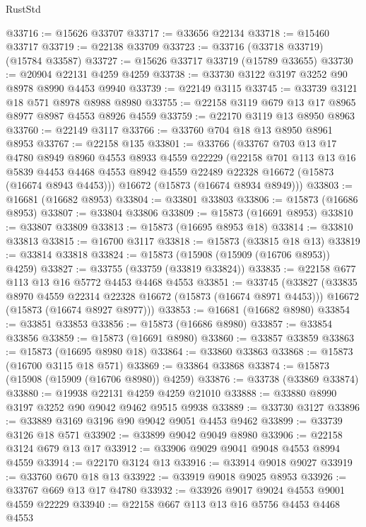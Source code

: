 \begin{lexlean}{RustStd}
\begin{coremodule}
@33716 := @15626 @33707
@33717 := @33656 @22134
@33718 := @15460 @33717
@33719 := @22138 @33709
@33723 := @33716 (@33718 @33719) (@15784 @33587)
@33727 := @15626 @33717 @33719 (@15789 @33655)
@33730 := @20904 @22131 @4259 @4259
@33738 := @33730 @3122 @3197 @3252 @90 @8978 @8990 @4453 @9940
@33739 := @22149 @3115
@33745 := @33739 @3121 @18 @571 @8978 @8988 @8980
@33755 := @22158 @3119 @679 @13 @17 @8965 @8977 @8987 @4553 @8926 @4559
@33759 := @22170 @3119 @13 @8950 @8963
@33760 := @22149 @3117
@33766 := @33760 @704 @18 @13 @8950 @8961 @8953
@33767 := @22158 @135
@33801 := @33766
    (@33767
      @703
      @13
      @17
      @4780
      @8949
      @8960
      @4553
      @8933
      @4559
      @22229
      (@22158
        @701
        @113
        @13
        @16
        @5839
        @4453
        @4468
        @4553
        @8942
        @4559
        @22489
        @22328
        @16672
        (@15873 (@16674 @8943 @4453)))
      @16672
      (@15873 (@16674 @8934 @8949)))
@33803 := @16681 (@16682 @8953)
@33804 := @33801 @33803
@33806 := @15873 (@16686 @8953)
@33807 := @33804 @33806
@33809 := @15873 (@16691 @8953)
@33810 := @33807 @33809
@33813 := @15873 (@16695 @8953 @18)
@33814 := @33810 @33813
@33815 := @16700 @3117
@33818 := @15873 (@33815 @18 @13)
@33819 := @33814 @33818
@33824 := @15873 (@15908 (@15909 (@16706 @8953)) @4259)
@33827 := @33755 (@33759 (@33819 @33824))
@33835 := @22158 @677 @113 @13 @16 @5772 @4453 @4468 @4553
@33851 := @33745
    (@33827
      (@33835 @8970 @4559 @22314 @22328 @16672 (@15873 (@16674 @8971 @4453)))
      @16672
      (@15873 (@16674 @8927 @8977)))
@33853 := @16681 (@16682 @8980)
@33854 := @33851 @33853
@33856 := @15873 (@16686 @8980)
@33857 := @33854 @33856
@33859 := @15873 (@16691 @8980)
@33860 := @33857 @33859
@33863 := @15873 (@16695 @8980 @18)
@33864 := @33860 @33863
@33868 := @15873 (@16700 @3115 @18 @571)
@33869 := @33864 @33868
@33874 := @15873 (@15908 (@15909 (@16706 @8980)) @4259)
@33876 := @33738 (@33869 @33874)
@33880 := @19938 @22131 @4259 @4259 @21010
@33888 := @33880 @8990 @3197 @3252 @90 @9042 @9462 @9515 @9938
@33889 := @33730 @3127
@33896 := @33889 @3169 @3196 @90 @9042 @9051 @4453 @9462
@33899 := @33739 @3126 @18 @571
@33902 := @33899 @9042 @9049 @8980
@33906 := @22158 @3124 @679 @13 @17
@33912 := @33906 @9029 @9041 @9048 @4553 @8994 @4559
@33914 := @22170 @3124 @13
@33916 := @33914 @9018 @9027
@33919 := @33760 @670 @18 @13
@33922 := @33919 @9018 @9025 @8953
@33926 := @33767 @669 @13 @17 @4780
@33932 := @33926 @9017 @9024 @4553 @9001 @4559 @22229
@33940 := @22158 @667 @113 @13 @16 @5756 @4453 @4468 @4553

\end{coremodule}
\end{lexlean}
